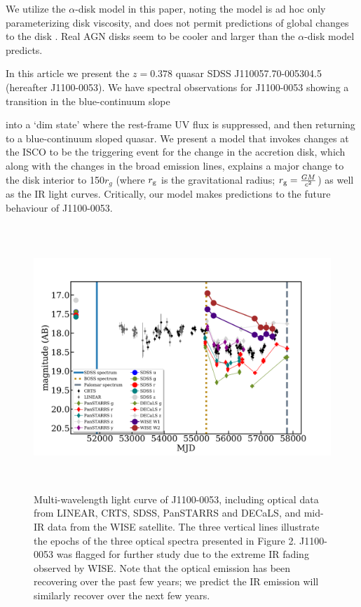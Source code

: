 \documentclass{nature}
\begin{document}
We utilize the $\alpha$-disk model in this paper, noting the model is
ad hoc only parameterizing disk viscosity, and does not permit
predictions of global changes to the disk \cite{King2012}. Real AGN
disks seem to be cooler \cite[e.g., ][]{Lawrence2012} and larger
\cite[e.g.,][]{Pooley2007, Morgan2010, Morgan2012, Mosquera2011} than
the $\alpha$-disk model predicts.

In this article we present the $z=0.378$ quasar SDSS
J110057.70-005304.5 (hereafter J1100-0053). 
We have spectral observations for  J1100-0053 showing a transition in the blue-continuum slope

into a `dim state' where the rest-frame
UV flux is suppressed, and then returning to a blue-continuum sloped
quasar.  We present a model that invokes changes at the ISCO to be the
triggering event for the change in the accretion disk, which along
with the changes in the broad emission lines, explains a major change
to the disk interior to 150$r_{g}$ (where $r_{\rm g}$ is the
gravitational radius; $r_{\rm g}=\frac{GM}{c^2}$) as well as the IR
light curves. Critically, our model makes predictions to the future
behaviour of J1100-0053.
 
\begin{figure}
  \centering
  \includegraphics[width=16.00cm, height=10.00cm, trim=0.0cm 0.0cm 0.0cm 0.0cm, clip]
  {../plots/lc/J110057_lc_20171204v1.png}
  \caption[]{
    Multi-wavelength light curve of J1100-0053,
    including optical data from LINEAR, CRTS, SDSS, PanSTARRS and
    DECaLS, and mid-IR data from the WISE satellite.  The three vertical
    lines illustrate the epochs of the three optical spectra presented
    in Figure 2.  J1100-0053 was flagged for further study due to the
    extreme IR fading observed by WISE.  Note that the optical emission
    has been recovering over the past few years; we predict the IR
    emission will similarly recover over the next few years.}
  \label{fig:J110057_LC_CRTS}
\end{figure}
\end{document}
